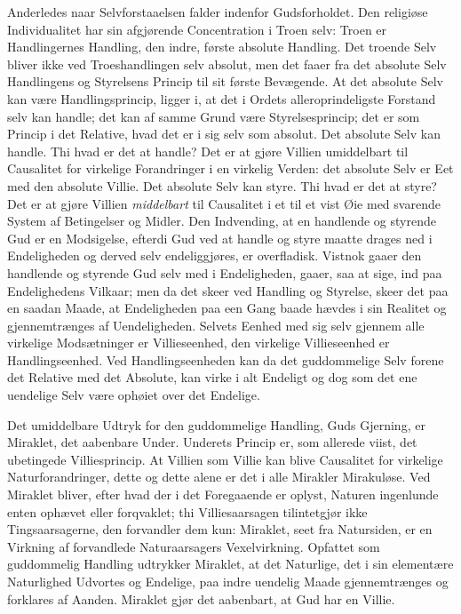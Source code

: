 \documentclass[12pt]{book}
\begin{document}
Anderledes naar Selvforstaaelsen falder indenfor Gudsforholdet. Den
religiøse Individualitet har sin afgjørende Concentration i Troen
selv: Troen er Handlingernes Handling, den indre, første absolute
Handling. Det troende Selv bliver ikke ved Troeshandlingen selv
absolut, men det faaer fra det absolute Selv Handlingens og
Styrelsens Princip til sit første Bevægende. At det absolute Selv
kan være Handlingsprincip, ligger i, at det i Ordets
alleroprindeligste Forstand selv kan handle; det kan af samme Grund
være Styrelsesprincip; det er som Princip i det Relative, hvad det
er i sig selv som absolut. Det absolute Selv kan handle. Thi hvad er
det at handle? Det er at gjøre Villien umiddelbart til Causalitet
for virkelige Forandringer i en virkelig Verden: det absolute Selv
er Eet med den absolute Villie. Det absolute Selv kan styre. Thi
hvad er det at styre? Det er at gjøre Villien \emph{middelbart} til
Causalitet i et til et vist Øie med svarende System af Betingelser
og Midler. Den Indvending, at en handlende og styrende Gud er en
Modsigelse, efterdi Gud ved at handle og styre maatte drages ned i
Endeligheden og derved selv endeliggjøres, er overfladisk. Vistnok
gaaer den handlende og styrende Gud selv med i Endeligheden, gaaer,
saa at sige, ind paa Endelighedens Vilkaar; men da det skeer ved
Handling og Styrelse, skeer det paa en saadan Maade, at Endeligheden
paa een Gang baade hævdes i sin Realitet og gjennemtrænges af
Uendeligheden. Selvets Eenhed med sig selv gjennem alle virkelige
Modsætninger er Villieseenhed, den virkelige Villieseenhed er
Handlingseenhed. Ved Handlingseenheden kan da det guddommelige Selv
forene det Relative med det Absolute, kan virke i alt Endeligt og
dog som det ene uendelige Selv være ophøiet over det Endelige.

Det umiddelbare Udtryk for den guddommelige Handling, Guds
Gjerning, er Miraklet, det aabenbare Under. Underets Princip er, som
allerede viist, det ubetingede Villiesprincip. At Villien som Villie
kan blive Causalitet for virkelige Naturforandringer, dette og dette
alene er det i alle Mirakler Mirakuløse. Ved Miraklet bliver, efter
hvad der i det Foregaaende er oplyst, Naturen ingenlunde enten
ophævet eller forqvaklet; thi Villiesaarsagen tilintetgjør ikke
Tingsaarsagerne, den forvandler dem kun: Miraklet, seet fra
Natursiden, er en Virkning af forvandlede Naturaarsagers
Vexelvirkning. Opfattet som guddommelig Handling udtrykker Miraklet,
at det Naturlige, det i sin elementære Naturlighed Udvortes og
Endelige, paa indre uendelig Maade gjennemtrænges og forklares af
Aanden. Miraklet gjør det aabenbart, at Gud har en Villie.
\end{document}
